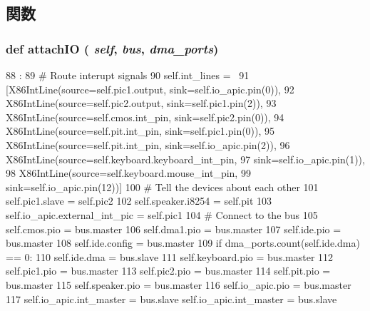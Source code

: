 \subsection{関数}
\hypertarget{classSouthBridge_1_1SouthBridge_ac750675f6d6de3ad52f8c5b03ee45a65}{
\subsubsection[{attachIO}]{\setlength{\rightskip}{0pt plus 5cm}def attachIO ( {\em self}, \/   {\em bus}, \/   {\em dma\_\-ports})}}
\label{classSouthBridge_1_1SouthBridge_ac750675f6d6de3ad52f8c5b03ee45a65}



\begin{DoxyCode}
88                                       :
89         # Route interupt signals
90         self.int_lines = \
91           [X86IntLine(source=self.pic1.output, sink=self.io_apic.pin(0)),
92            X86IntLine(source=self.pic2.output, sink=self.pic1.pin(2)),
93            X86IntLine(source=self.cmos.int_pin, sink=self.pic2.pin(0)),
94            X86IntLine(source=self.pit.int_pin, sink=self.pic1.pin(0)),
95            X86IntLine(source=self.pit.int_pin, sink=self.io_apic.pin(2)),
96            X86IntLine(source=self.keyboard.keyboard_int_pin,
97                       sink=self.io_apic.pin(1)),
98            X86IntLine(source=self.keyboard.mouse_int_pin,
99                       sink=self.io_apic.pin(12))]
100         # Tell the devices about each other
101         self.pic1.slave = self.pic2
102         self.speaker.i8254 = self.pit
103         self.io_apic.external_int_pic = self.pic1
104         # Connect to the bus
105         self.cmos.pio = bus.master
106         self.dma1.pio = bus.master
107         self.ide.pio = bus.master
108         self.ide.config = bus.master
109         if dma_ports.count(self.ide.dma) == 0:
110                 self.ide.dma = bus.slave
111         self.keyboard.pio = bus.master
112         self.pic1.pio = bus.master
113         self.pic2.pio = bus.master
114         self.pit.pio = bus.master
115         self.speaker.pio = bus.master
116         self.io_apic.pio = bus.master
117         self.io_apic.int_master = bus.slave
        self.io_apic.int_master = bus.slave
\end{DoxyCode}


